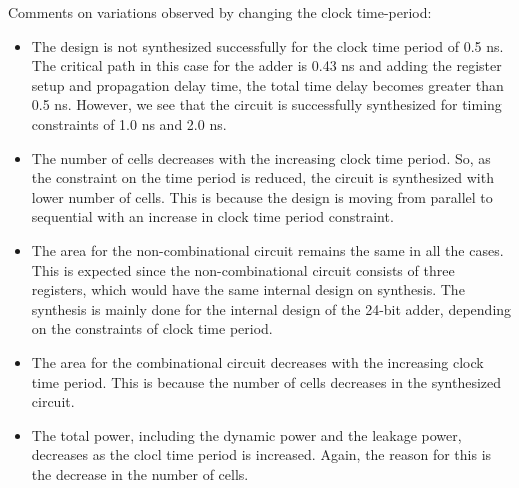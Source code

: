 \documentclass[11pt,a4paper]{article}
\begin{document}
\noindent Comments on variations observed by changing the clock time-period:
\begin{itemize}
\item The design is not synthesized successfully for the clock time period of 0.5 ns. The critical path in this case for the adder is 0.43 ns and adding the register setup and propagation delay time, the total time delay becomes greater than 0.5 ns. However, we see that the circuit is successfully synthesized for timing constraints of 1.0 ns and 2.0 ns.

\item The number of cells decreases with the increasing clock time period. So, as the constraint on the time period is reduced, the circuit is synthesized with lower number of cells. This is because the design is moving from parallel to sequential with an increase in clock time period constraint.

\item The area for the non-combinational circuit remains the same in all the cases. This is expected since the non-combinational circuit consists of three registers, which would have the same internal design on synthesis. The synthesis is mainly done for the internal design of the 24-bit adder, depending on the constraints of clock time period.

\item The area for the combinational circuit decreases with the increasing clock time period. This is because the number of cells decreases in the synthesized circuit.

\item The total power, including the dynamic power and the leakage power, decreases as the clocl time period is increased. Again, the reason for this is the decrease in the number of cells. 
\end{itemize}
\end{document}
